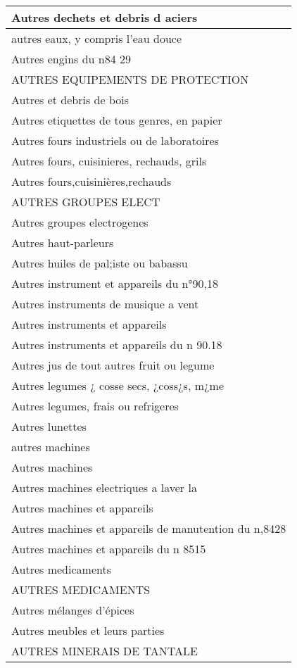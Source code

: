\documentclass[
]{book}
\begin{document}
\begin{table}
\begin{tabular}[t]{l}
\hline
Autres dechets et debris d aciers\\
\hline
autres eaux, y compris l'eau douce\\
\hline
Autres engins du n84 29\\
\hline
AUTRES EQUIPEMENTS DE PROTECTION\\
\hline
Autres et debris de bois\\
\hline
Autres etiquettes de tous genres, en papier\\
\hline
Autres fours industriels ou de laboratoires\\
\hline
Autres fours, cuisinieres, rechauds, grils\\
\hline
Autres fours,cuisinières,rechauds\\
\hline
AUTRES GROUPES ELECT\\
\hline
Autres groupes electrogenes\\
\hline
Autres haut-parleurs\\
\hline
Autres huiles de pal;iste ou babassu\\
\hline
Autres instrument et appareils du n°90,18\\
\hline
Autres instruments de musique a vent\\
\hline
Autres instruments et appareils\\
\hline
Autres instruments et appareils du n 90.18\\
\hline
Autres jus de tout autres fruit ou legume\\
\hline
Autres legumes ¿ cosse secs, ¿coss¿s, m¿me\\
\hline
Autres legumes, frais ou refrigeres\\
\hline
Autres lunettes\\
\hline
autres machines\\
\hline
Autres machines\\
\hline
Autres machines electriques a laver la\\
\hline
Autres machines et appareils\\
\hline
Autres machines et appareils de manutention du n,8428\\
\hline
Autres machines et appareils du n 8515\\
\hline
Autres medicaments\\
\hline
AUTRES MEDICAMENTS\\
\hline
Autres mélanges d'épices\\
\hline
Autres meubles et leurs parties\\
\hline
AUTRES MINERAIS DE TANTALE\\
\hline

\end{tabular}
\end{table}
\end{document}
